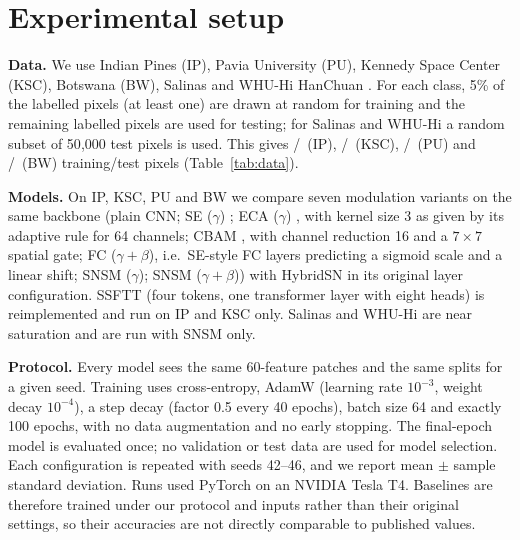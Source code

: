 \documentclass[]{interact}
\begin{document}
\section{Experimental setup}\label{sec:setup}
\textbf{Data.} We use Indian Pines (IP), Pavia University (PU), Kennedy Space Center (KSC), Botswana (BW), Salinas and WHU-Hi HanChuan \citep{baumgardner2015indian,gamba2004pavia,gic2020hyperspectral,zhong2020whu}. For each class, 5\% of the labelled pixels (at least one) are drawn at random for training and the remaining labelled pixels are used for testing; for Salinas and WHU-Hi a random subset of 50{,}000 test pixels is used. This gives \ntrainIndianPines/\ntestIndianPines\ (IP), \ntrainKSC/\ntestKSC\ (KSC), \ntrainPaviaU/\ntestPaviaU\ (PU) and \ntrainBotswana/\ntestBotswana\ (BW) training/test pixels (Table~\ref{tab:data}).

\begin{table}[t]
{\resizebox{\textwidth}{!}{}}
\end{table}

\textbf{Models.} On IP, KSC, PU and BW we compare seven modulation variants on the same backbone (plain CNN; SE ($\gamma$) \citep{hu2018squeeze}; ECA ($\gamma$) \citep{wang2020eca}, with kernel size 3 as given by its adaptive rule for 64 channels; CBAM \citep{woo2018cbam}, with channel reduction 16 and a $7\times7$ spatial gate; FC ($\gamma{+}\beta$), i.e.\ SE-style FC layers predicting a sigmoid scale and a linear shift; SNSM ($\gamma$); SNSM ($\gamma{+}\beta$)) with HybridSN \citep{roy2020hybridsn} in its original layer configuration. SSFTT \citep{sun2022ssftt} (four tokens, one transformer layer with eight heads) is reimplemented and run on IP and KSC only. Salinas and WHU-Hi are near saturation and are run with SNSM only.

\textbf{Protocol.} Every model sees the same 60-feature patches and the same splits for a given seed. Training uses cross-entropy, AdamW \citep{loshchilov2019decoupled} (learning rate $10^{-3}$, weight decay $10^{-4}$), a step decay (factor 0.5 every 40 epochs), batch size 64 and exactly 100 epochs, with no data augmentation and no early stopping. The final-epoch model is evaluated once; no validation or test data are used for model selection. Each configuration is repeated with seeds 42--46, and we report mean $\pm$ sample standard deviation. Runs used PyTorch \citep{paszke2019pytorch} on an NVIDIA Tesla T4. Baselines are therefore trained under our protocol and inputs rather than their original settings, so their accuracies are not directly comparable to published values.
\end{document}
